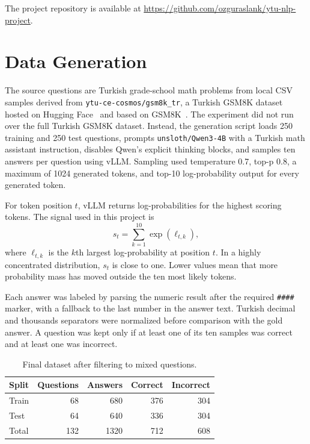 \documentclass[conference]{IEEEtran}
\begin{document}
The project repository is available at
\url{https://github.com/ozguraslank/ytu-nlp-project}.

\section{Data Generation}
The source questions are Turkish grade-school math problems from local CSV
samples derived from \texttt{ytu-ce-cosmos/gsm8k\_tr}, a Turkish GSM8K dataset
hosted on Hugging Face~\cite{huggingfacegsm8ktr} and based on
GSM8K~\cite{cobbe2021gsm8k}. The experiment did not run over the full Turkish
GSM8K dataset. Instead, the generation script loads 250 training and 250 test
questions, prompts \texttt{unsloth/Qwen3-4B} with a Turkish math assistant
instruction, disables Qwen's explicit thinking blocks, and samples ten answers
per question using vLLM. Sampling used temperature 0.7, top-p 0.8, a maximum of
1024 generated tokens, and top-10 log-probability output for every generated
token.

For token position $t$, vLLM returns log-probabilities for the highest scoring
tokens. The signal used in this project is
\begin{equation}
    s_t = \sum_{k=1}^{10} \exp(\ell_{t,k}),
\end{equation}
where $\ell_{t,k}$ is the $k$th largest log-probability at position $t$. In a
highly concentrated distribution, $s_t$ is close to one. Lower values mean that
more probability mass has moved outside the ten most likely tokens.

Each answer was labeled by parsing the numeric result after the required
\texttt{\#\#\#\#} marker, with a fallback to the last number in the answer text.
Turkish decimal and thousands separators were normalized before comparison with
the gold answer. A question was kept only if at least one of its ten samples was
correct and at least one was incorrect.

\begin{table}[t]
\caption{Final dataset after filtering to mixed questions.}
\label{tab:data}
\centering
\begin{tabular}{lrrrr}
\toprule
Split & Questions & Answers & Correct & Incorrect \\
\midrule
Train & 68 & 680 & 376 & 304 \\
Test & 64 & 640 & 336 & 304 \\
\midrule
Total & 132 & 1320 & 712 & 608 \\
\bottomrule
\end{tabular}
\end{table}
\end{document}
